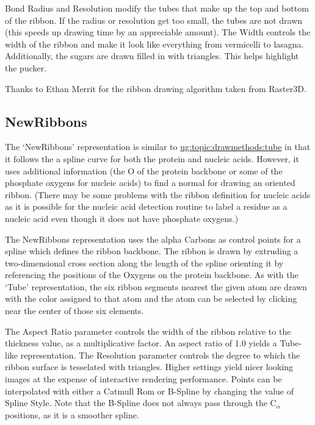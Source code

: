 Bond {\sf Radius} and {\sf Resolution} modify the tubes that make up the top
and bottom of the ribbon.  If the radius or resolution get too small, the
tubes are not drawn (this speeds up drawing time by an appreciable amount).
The {\sf Width} controls the width of the ribbon and make it look like
everything from vermicelli to lasagna.  Additionally, the sugars are drawn
filled in with triangles.  This helps highlight the pucker.

Thanks to Ethan Merrit for the ribbon drawing algorithm taken from
Raster3D.


\subsection{NewRibbons}
\label{ug:topic:drawmethods:newribbons}
The `NewRibbons' representation is similar to \hyperref{`Tube'}{`Tube'
[\S~}{]}{ug:topic:drawmethods:tube} in that it follows the a spline curve
for both the protein and nucleic acids.  However, it uses additional
information (the O of the protein backbone or some of the phosphate oxygens
for nucleic acids) to find a normal for drawing an oriented ribbon.  (There
may be some problems with the ribbon definition for nucleic acids as it is
possible for the nucleic acid detection routine to label a residue as a
nucleic acid even though it does not have phosphate oxygens.)

The NewRibbons representation uses the alpha Carbons as control points
for a spline which defines the ribbon backbone.  The ribbon is drawn by 
extruding a two-dimensional cross section along the length of the spline
orienting it by referencing the positions of the Oxygens on the protein
backbone.
As with the `Tube' representation, the six ribbon segments nearest the 
given atom are drawn with the color assigned to that atom and the 
atom can be selected by clicking near the center of those six elements.

The {\sf Aspect Ratio} parameter controls the width of the ribbon relative
to the thickness value, as a multiplicative factor.  An aspect ratio of 1.0
yields a Tube-like representation.  The {\sf Resolution} parameter controls
the degree to which the ribbon surface is tesselated with triangles.  Higher
settings yield nicer looking images at the expense of interactive rendering
performance. Points can be interpolated with either a Catmull Rom or
B-Spline by changing the value of {\sf Spline Style}. Note that the B-Spline
does not always pass through the C${}_\alpha$ positions, as it is a smoother
spline.


